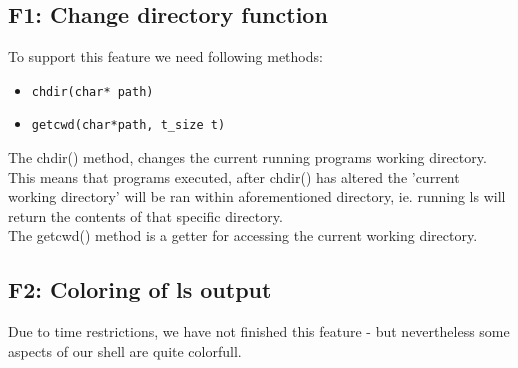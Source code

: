 \subsection{F1: Change directory function}
To support this feature we need following methods:
\begin{itemize}
\item \begin{verbatim}chdir(char* path)
\end{verbatim}
\item \begin{verbatim}getcwd(char*path, t_size t)
\end{verbatim}
\end{itemize}
The chdir() method, changes the current running programs working directory. This means that programs executed, after chdir() has altered the 'current working directory' will be ran within aforementioned directory, ie. running ls will return the contents of that specific directory.\\

The getcwd() method is a getter for accessing the current working directory.

\subsection{F2: Coloring of ls output}
Due to time restrictions, we have not finished this feature - but nevertheless some aspects of our  shell are quite colorfull.